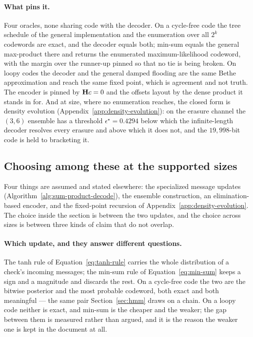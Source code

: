 \documentclass[11pt,a4paper]{article}
\begin{document}
\paragraph{What pins it.}
Four oracles, none sharing code with the decoder. On a cycle-free code the
tree schedule of the general implementation and the enumeration over all
$2^k$ codewords are exact, and the decoder equals both; min-sum equals the
general max-product there and returns the enumerated maximum-likelihood
codeword, with the margin over the runner-up pinned so that no tie is being
broken. On loopy codes the decoder and the general damped flooding are the
same Bethe approximation and reach the same fixed point, which is agreement
and not truth. The encoder is pinned by $\mathbf{H} c = 0$ and the offsets
layout by the dense product it stands in for. And at size, where no
enumeration reaches, the closed form is density evolution
(Appendix~\ref{app:density-evolution}): on the erasure channel the $(3,6)$
ensemble has a threshold $\epsilon^\star = 0.4294$ below which the
infinite-length decoder resolves every erasure and above which it does not,
and the $19{,}998$-bit code is held to bracketing it.

\subsection{Choosing among these at the supported sizes}
\label{sec:ldpc:discussion}
Four things are assumed and stated elsewhere: the specialized message
updates (Algorithm~\ref{alg:sum-product-decode}), the ensemble construction,
an elimination-based encoder, and the fixed-point recursion of
Appendix~\ref{app:density-evolution}. The choice inside the section is
between the two updates, and the choice across sizes is between three kinds
of claim that do not overlap.

\paragraph{Which update, and they answer different questions.}
The tanh rule of Equation~\ref{eq:tanh-rule} carries the whole distribution
of a check's incoming messages; the min-sum rule of
Equation~\ref{eq:min-sum} keeps a sign and a magnitude and discards the
rest. On a cycle-free code the two are the bitwise posterior and the most
probable codeword, both exact and both meaningful --- the same pair
Section~\ref{sec:hmm} draws on a chain. On a loopy code neither is exact,
and min-sum is the cheaper and the weaker; the gap between them is measured
rather than argued, and it is the reason the weaker one is kept in the
document at all.
\end{document}
